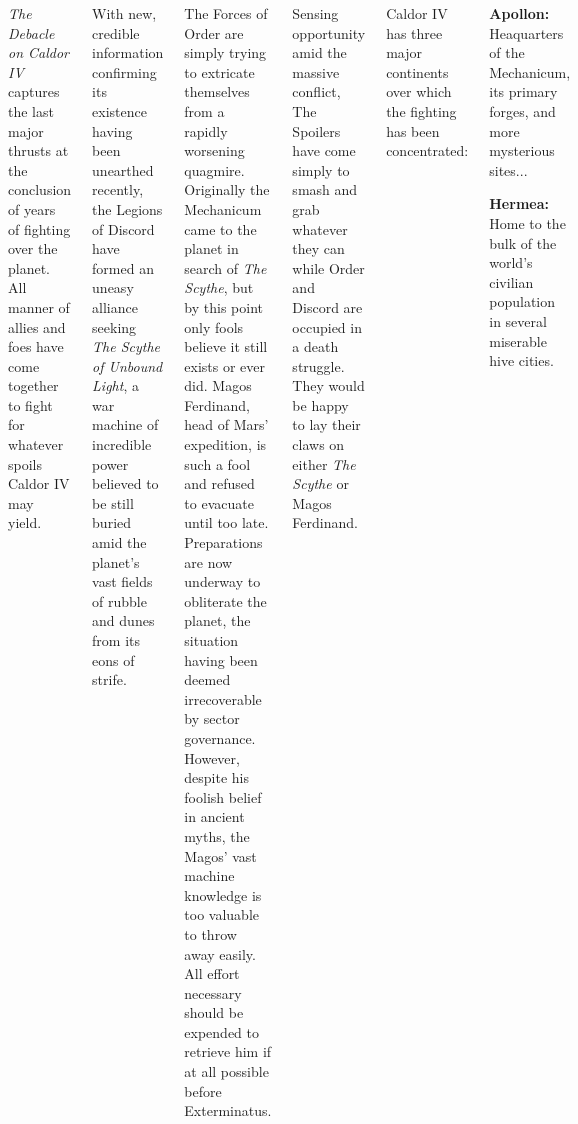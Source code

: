 \clearpage
{}

\begin{columns}

  \emph{The Debacle on Caldor IV} captures the last major thrusts at
  the conclusion of years of fighting over the planet.  All manner of
  allies and foes have come together to fight for whatever spoils
  Caldor IV may yield.


  With new, credible information confirming its existence having been
  unearthed recently, the Legions of Discord have formed an uneasy
  alliance seeking \emph{The Scythe of Unbound Light}, a war machine
  of incredible power believed to be still buried amid the planet's
  vast fields of rubble and dunes from its eons of strife.

  The Forces of Order are simply trying to extricate themselves from a
  rapidly worsening quagmire.  Originally the Mechanicum came to the
  planet in search of \emph{The Scythe}, but by this point only fools
  believe it still exists or ever did.  Magos Ferdinand, head of Mars'
  expedition, is such a fool and refused to evacuate until too late.
  Preparations are now underway to obliterate the planet, the
  situation having been deemed irrecoverable by sector governance.
  However, despite his foolish belief in ancient myths, the Magos'
  vast machine knowledge is too valuable to throw away easily. All
  effort necessary should be expended to retrieve him if at all
  possible before Exterminatus.

  Sensing opportunity amid the massive conflict, The Spoilers have
  come simply to smash and grab whatever they can while Order and
  Discord are occupied in a death struggle.  They would be happy to
  lay their claws on either \emph{The Scythe} or Magos Ferdinand.



  Caldor IV has three major continents over which the fighting has
  been concentrated:

  \begin{squishitemize}
  \item \textbf{Apollon:} Heaquarters of the Mechanicum, its primary
    forges, and more mysterious sites...

  \item \textbf{Hermea:} Home to the bulk of the world's civilian
    population in several miserable hive cities.


\end{squishitemize}
\end{columns}
